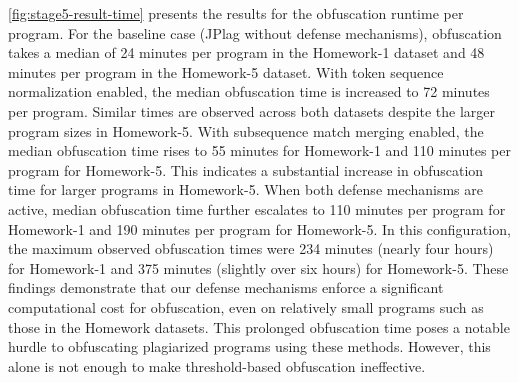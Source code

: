 \autoref{fig:stage5-result-time} presents the results for the obfuscation runtime per program. For the baseline case (JPlag without defense mechanisms), obfuscation takes a median of 24 minutes per program in the Homework-1 dataset and 48 minutes per program in the Homework-5 dataset.
%
With token sequence normalization enabled, the median obfuscation time is increased to 72 minutes per program. Similar times are observed across both datasets despite the larger program sizes in Homework-5.
%
With subsequence match merging enabled, the median obfuscation time rises to 55 minutes for Homework-1 and 110 minutes per program for Homework-5. This indicates a substantial increase in obfuscation time for larger programs in Homework-5. 
When both defense mechanisms are active, median obfuscation time further escalates to 110 minutes per program for Homework-1 and 190 minutes per program for Homework-5. In this configuration, the maximum observed obfuscation times were 234 minutes (nearly four hours) for Homework-1 and 375 minutes (slightly over six hours) for Homework-5.
%
These findings demonstrate that our defense mechanisms enforce a significant computational cost for obfuscation, even on relatively small programs such as those in the Homework datasets. This prolonged obfuscation time poses a notable hurdle to obfuscating plagiarized programs using these methods. However, this alone is not enough to make threshold-based obfuscation ineffective.


